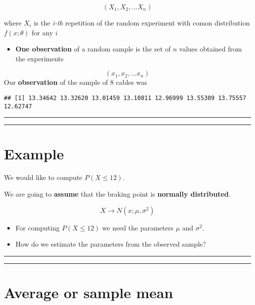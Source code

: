 \documentclass[
]{book}
\providecommand{\tightlist}{%
  \setlength{\itemsep}{0pt}\setlength{\parskip}{0pt}}
\begin{document}
\[(X_1, X_2, ... X_n)\]

where \(X_i\) is the \emph{i-th} repetition of the random experiment with comon distribution \(f(x; \theta)\) for any \(i\)

\begin{itemize}
\tightlist
\item
  \textbf{One observation} of a random sample is the set of \(n\) values obtained from the experiments
\end{itemize}

\[(x_1, x_2, ... x_n)\]
Our \textbf{observation} of the sample of \(8\) cables was

\begin{verbatim}
## [1] 13.34642 13.32620 13.01459 13.10811 12.96999 13.55309 13.75557 12.62747
\end{verbatim}

\begin{center}\rule{0.5\linewidth}{0.5pt}\end{center}

\begin{center}\rule{0.5\linewidth}{0.5pt}\end{center}

\hypertarget{example-13}{%
\section{Example}\label{example-13}}

We would like to compute \(P(X \leq 12)\).

We are going to \textbf{assume} that the braking point is \textbf{normally distributed}.

\[X \rightarrow N(x; \mu, \sigma^2)\]

\begin{itemize}
\item
  For computing \(P(X \leq 12)\) we need the parameters \(\mu\) and \(\sigma^2\).
\item
  How do we estimate the parameters from the observed sample?
\end{itemize}

\begin{center}\rule{0.5\linewidth}{0.5pt}\end{center}

\begin{center}\rule{0.5\linewidth}{0.5pt}\end{center}

\hypertarget{average-or-sample-mean}{%
\section{Average or sample mean}\label{average-or-sample-mean}}
\end{document}
